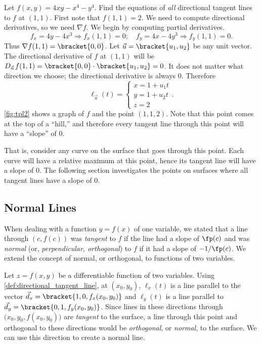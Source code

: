 \begin{example}\label{ex_tpl2}
Let $f(x,y) = 4xy-x^4-y^4$. Find the equations of \emph{all} directional tangent lines to $f$ at $(1,1)$.
\solution
First note that $f(1,1) = 2$. We need to compute directional derivatives, so we need $\nabla f$. We begin by computing partial derivatives.
\[
f_x = 4y-4x^3 \Rightarrow f_x(1,1) = 0;\quad f_y = 4x-4y^3\Rightarrow f_y(1,1) = 0.
\]
Thus $\nabla f(1,1) =\bracket{0,0}$. Let $\vec u =\bracket{u_1,u_2}$ be any unit vector. The directional derivative of $f$ at $(1,1)$ will be $D_{\vec u\,}f(1,1) =\bracket{0,0}\cdot\bracket{u_1,u_2}= 0$. It does not matter what direction we choose; the directional derivative is always 0. Therefore
%
%
\[
\ell_{\vec u}(t) = \begin{cases}x= 1 +u_1t\\ y = 1+ u_2 t\\ z= 2\end{cases}.
\]
\autoref{fig:tpl2} shows a graph of $f$ and the point $(1,1,2)$. Note that this point comes at the top of a ``hill,'' and therefore every tangent line through this point will have a ``slope'' of 0. 

That is, consider any curve on the surface that goes through this point. Each curve will have a relative maximum at this point, hence its tangent line will have a slope of 0. The following section investigates the points on surfaces where all tangent lines have a slope of 0.
\end{example}

\subsection{Normal Lines}

When dealing with a function $y=f(x)$ of one variable, we stated that a line through $(c,f(c))$ was \emph{tangent} to $f$ if the line had a slope of $\fp(c)$ and was \emph{normal} (or, \emph{perpendicular, orthogonal}) to $f$ if it had a slope of $-1/\fp(c)$. We extend the concept of normal, or orthogonal, to functions of two variables. 

Let $z=f(x,y)$ be a differentiable function of two variables. Using \autoref{def:directional_tangent_line}, at $(x_0,y_0)$, $\ell_x(t)$ is a line parallel to the vector $\vec d_x=\bracket{1,0,f_x(x_0,y_0)}$ and $\ell_y(t)$ is a line parallel to $\vec d_y=\bracket{0,1,f_y(x_0,y_0)}$. Since lines in these directions through $\bigl(x_0,y_0,f(x_0,y_0)\bigr)$ are \emph{tangent} to the surface, a line through this point and orthogonal to these directions would be \emph{orthogonal}, or \emph{normal}, to the surface. We can use this direction to create a normal line.

